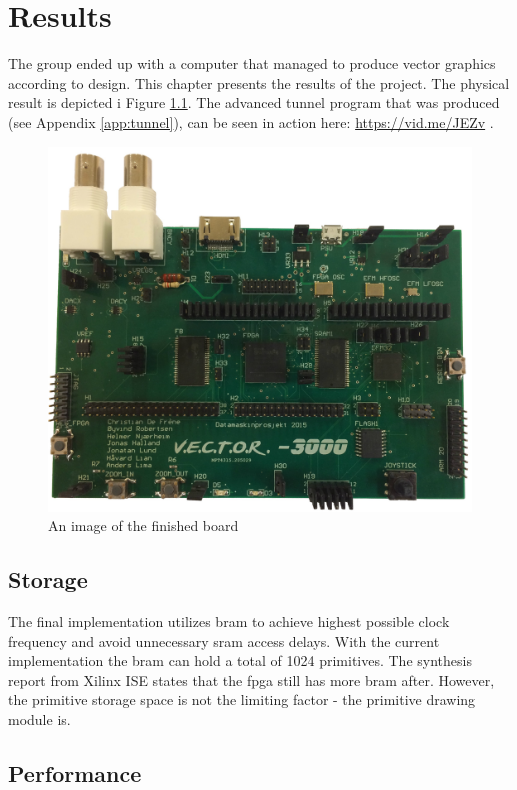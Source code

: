 \chapter{Results}
The group ended up with a computer that managed to produce vector graphics according to design.
This chapter presents the results of the project.
The physical result is depicted i Figure \ref{fig:board-top}.
The advanced tunnel program that was produced (see Appendix \ref{app:tunnel}), can be seen in action here: \href{https://vid.me/JEZv}{https://vid.me/JEZv} \cite{tunnel-demo}.

\begin{figure}[h!]
	    \includegraphics[width=\linewidth]{images/board_top.jpg}
	    \caption{An image of the finished \vthreek board}
	    \label{fig:board-top}
\end{figure}

\section{Storage}
The final implementation utilizes \gls{bram} to achieve highest possible clock frequency and avoid unnecessary \gls{sram} access delays.
With the current implementation the \gls{bram} can hold a total of 1024 primitives.
The synthesis report from Xilinx ISE states that the \gls{fpga} still has more \gls{bram} after.
However, the primitive storage space is not the limiting factor - the primitive drawing module is.

\section{Performance}


